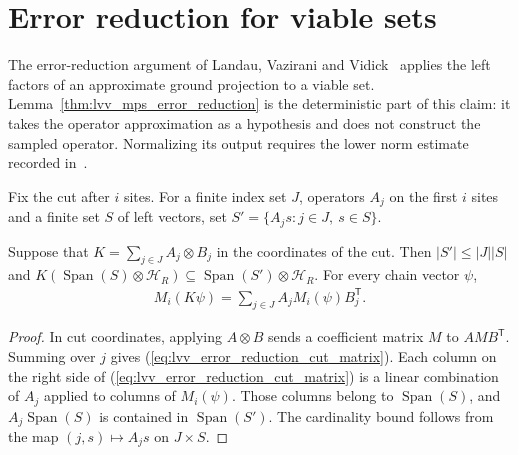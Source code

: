 \section{Error reduction for viable sets}
\label{sec:lvv_error_reduction}

The error-reduction argument of Landau, Vazirani and
Vidick~\cite[Claim~2.11, source lines 580--592]{Landau2015Polynomial} applies
the left factors of an approximate ground projection to a viable set.
Lemma~\ref{thm:lvv_mps_error_reduction} is the deterministic part of this
claim: it takes the operator approximation as a hypothesis and does not
construct the sampled operator. Normalizing its output requires the lower norm
estimate recorded in~\cite{gap:lvv13_error_reduction_witness_norm}.

\begin{definition}
    \label{def:lvv_error_reduction_family}
    \leanok
    Fix the cut after $i$ sites. For a finite index set $J$, operators $A_j$
    on the first $i$ sites and a finite set $S$ of left vectors, set
    $S'=\{A_js:j\in J,\ s\in S\}$.
\end{definition}

\begin{lemma}
    \label{lem:lvv_error_reduction_support}
    \leanok
    Suppose that $K=\sum_{j\in J}A_j\otimes B_j$ in the coordinates of the
    cut. Then $|S'|\le |J||S|$ and
    $K(\operatorname{Span}(S)\otimes\mathcal H_R)
        \subseteq\operatorname{Span}(S')\otimes\mathcal H_R$.
    For every chain vector $\psi$,
    \begin{align}
        M_i(K\psi)=\sum_{j\in J}A_jM_i(\psi)B_j^{\mathsf T}.
        \label{eq:lvv_error_reduction_cut_matrix}
    \end{align}
\end{lemma}
\begin{proof}
    \leanok
    In cut coordinates, applying $A\otimes B$ sends a coefficient matrix
    $M$ to $AMB^{\mathsf T}$. Summing over $j$ gives
    (\ref{eq:lvv_error_reduction_cut_matrix}).
    Each column on the right side of
    (\ref{eq:lvv_error_reduction_cut_matrix}) is a linear combination of
    $A_j$ applied to columns of $M_i(\psi)$. Those columns belong to
    $\operatorname{Span}(S)$, and $A_j\operatorname{Span}(S)$ is contained in
    $\operatorname{Span}(S')$. The cardinality bound follows from the map
    $(j,s)\mapsto A_js$ on $J\times S$.
\end{proof}


